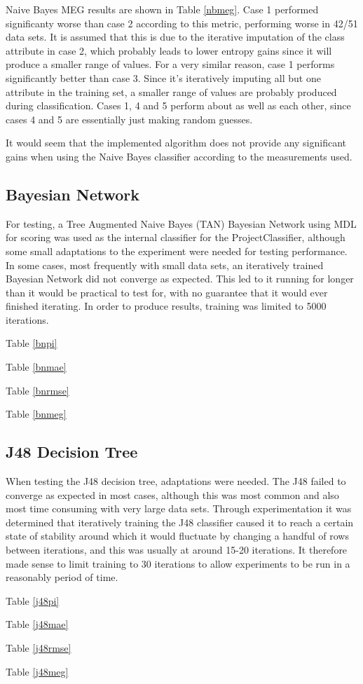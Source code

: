 Naive Bayes MEG results are shown in Table \ref{nbmeg}. Case 1 performed significanty worse than case 2 according to this metric, performing worse in 42/51 data sets. It is assumed that this is due to the iterative imputation of the class attribute in case 2, which probably leads to lower entropy gains since it will produce a smaller range of values. For a very similar reason, case 1 performs significantly better than case 3. Since it's iteratively imputing all but one attribute in the training set, a smaller range of values are probably produced during classification. Cases 1, 4 and 5 perform about as well as each other, since cases 4 and 5 are essentially just making random guesses.

It would seem that the implemented algorithm does not provide any significant gains when using the Naive Bayes classifier according to the measurements used.






\subsection{Bayesian Network}
For testing, a Tree Augmented Naive Bayes (TAN) Bayesian Network using MDL for scoring was used as the internal classifier for the ProjectClassifier, although some small adaptations to the experiment were needed for testing performance. In some cases, most frequently with small data sets, an iteratively trained Bayesian Network did not converge as expected. This led to it running for longer than it would be practical to test for, with no guarantee that it would ever finished iterating. In order to produce results, training was limited to 5000 iterations.

Table \ref{bnpi}

Table \ref{bnmae}

Table \ref{bnrmse}

Table \ref{bnmeg}







\subsection{J48 Decision Tree}
When testing the J48 decision tree, adaptations were needed. The J48 failed to converge as expected in most cases, although this was most common and also most time consuming with very large data sets. Through experimentation it was determined that iteratively training the J48 classifier caused it to reach a certain state of stability around which it would fluctuate by changing a handful of rows between iterations, and this was usually at around 15-20 iterations. It therefore made sense to limit training to 30 iterations to allow experiments to be run in a reasonably period of time.

Table \ref{j48pi}

Table \ref{j48mae}

Table \ref{j48rmse}

Table \ref{j48meg}





